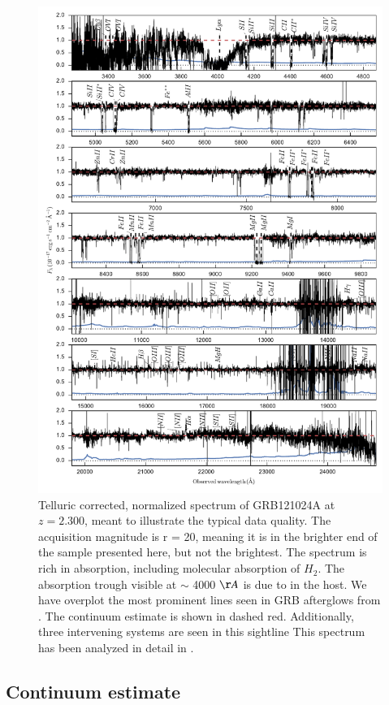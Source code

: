\documentclass{aa}    %
\begin{document}
\begin{figure}
	\centerline{\includegraphics[width=0.85\linewidth]{figures/GRB121024A.pdf}}
	\caption{Telluric corrected, normalized spectrum of GRB121024A at $z = 2.300$,
	meant to illustrate the typical data quality. The acquisition magnitude is r =
	20, meaning it is in the brighter end of the sample presented here, but not the
	brightest. The spectrum is rich in absorption, including molecular absorption
	of $H_2$. The absorption trough visible at $\sim$ 4000 $\AA$ is due to \lya in
	the host. We have overplot the most prominent lines seen in GRB afterglows from
	\citet{Christensen2011a}. The continuum estimate is shown in dashed red.
	Additionally, three intervening systems are seen in this sightline  This
	spectrum has been analyzed in detail in \citet{Friis2015}.}
	\label{fig:spectrum}
\end{figure}



\subsection{Continuum estimate} \label{continuum}
\end{document}
